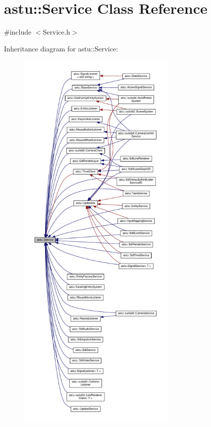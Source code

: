 \hypertarget{classastu_1_1Service}{}\section{astu\+:\+:Service Class Reference}
\label{classastu_1_1Service}


{\ttfamily \#include $<$Service.\+h$>$}



Inheritance diagram for astu\+:\+:Service\+:\nopagebreak
\begin{figure}[H]
\begin{center}
\leavevmode
\includegraphics[height=550pt]{classastu_1_1Service__inherit__graph}
\end{center}
\end{figure}


